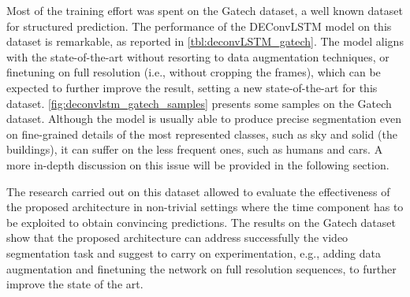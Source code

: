 Most of the training effort was spent on the Gatech dataset, a well known
dataset for structured prediction. The performance of the DEConvLSTM model on
this dataset is remarkable, as reported in \autoref{tbl:deconvLSTM_gatech}. The
model aligns with the state-of-the-art without resorting to data augmentation
techniques, or finetuning on full resolution (i.e., without cropping the
frames), which can be expected to further improve the result, setting a new
state-of-the-art for this dataset. \autoref{fig:deconvlstm_gatech_samples}
presents some samples on the Gatech dataset. Although the model is usually able
to produce precise segmentation even on fine-grained details of the most
represented classes, such as sky and solid (the buildings), it can suffer on
the less frequent ones, such as humans and cars. A more in-depth discussion on
this issue will be provided in the following section.

The research carried out on this dataset allowed to evaluate the effectiveness
of the proposed architecture in non-trivial settings where the time component
has to be exploited to obtain convincing predictions. The results on the Gatech
dataset show that the proposed architecture can address successfully the video
segmentation task and suggest to carry on experimentation, e.g., adding data
augmentation and finetuning the network on full resolution sequences, to
further improve the state of the art.

\begin{table}[t]
    \caption{Results on the Gatech dataset. Pixel accuracy is reported (higher
        is better). IoU is not reported as customary in the literature for this
        dataset.}
    \label{tbl:deconvLSTM_gatech}
\end{table}


